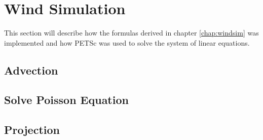 \section{Wind Simulation}

This section will describe how the formulas derived in chapter \ref{chap:windsim}
was implemented and how PETSc was used to solve the system of linear equations.

\subsection{Advection}

\subsection{Solve Poisson Equation}

\subsection{Projection}

